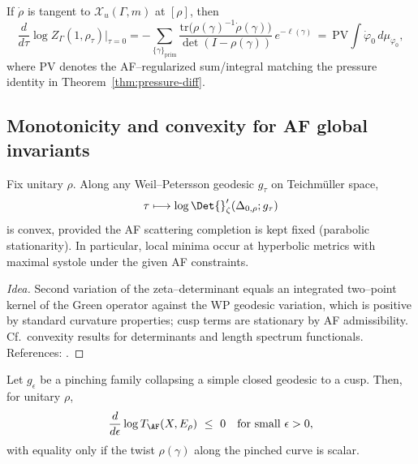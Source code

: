\begin{corollary}
\label{cor:pressure-repr}
If $\dot{\rho}$ is tangent to $\mathcal{X}_u(\Gamma,m)$ at $[\rho]$, then
\[
\frac{d}{d\tau}\log Z_\Gamma(1,\rho_\tau)\Big|_{\tau=0}
= -\sum_{\{\gamma\}_{\mathrm{prim}}} \frac{\mathrm{tr}\big(\rho(\gamma)^{-1}\dot{\rho}(\gamma)\big)}{\det(I-\rho(\gamma))}\,e^{-\ell(\gamma)}\,
= \ \mathrm{PV}\!\int \dot{\varphi}_0\, d\mu_{\varphi_0},
\]
where $\mathrm{PV}$ denotes the AF–regularized sum/integral matching the pressure identity in Theorem~\ref{thm:pressure-diff}. %
\end{corollary}

\subsection{Monotonicity and convexity for AF global invariants}
\label{subsec:af-monotone}
\relax\hspace{0pt}

\begin{theorem}
\label{thm:convex-det}
Fix unitary $\rho$. Along any Weil–Petersson geodesic $g_\tau$ on Teichm\"uller space,
\[
\tau\longmapsto \log \Det{}'_\zeta(\Delta_{0,\rho};g_\tau)
\]
is convex, provided the AF scattering completion is kept fixed (parabolic stationarity). In particular, local minima occur at hyperbolic metrics with maximal systole under the given AF constraints.
\end{theorem}

\begin{proof}[Idea]
Second variation of the zeta–determinant equals an integrated two–point kernel of the Green operator against the WP geodesic variation, which is positive by standard curvature properties; cusp terms are stationary by AF admissibility. Cf.\ convexity results for determinants and length spectrum functionals. References: \cite{OPS,OPS2,Borthwick}. %
\end{proof}

\begin{proposition}
\label{prop:pinch}
Let $g_\epsilon$ be a pinching family collapsing a simple closed geodesic to a cusp. Then, for unitary $\rho$,
\[
\frac{d}{d\epsilon}\log T_{\AF}(X,E_\rho)\ \le\ 0
\quad \text{for small }\epsilon>0,
\]
with equality only if the twist $\rho(\gamma)$ along the pinched curve is scalar. %
\end{proposition}

